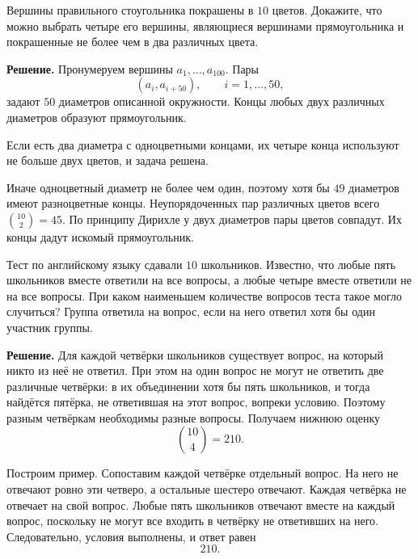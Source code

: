 \begin{problems}
\item Вершины правильного стоугольника покрашены в $10$ цветов. Докажите, что можно выбрать четыре его вершины, являющиеся вершинами прямоугольника и покрашенные не более чем в два различных цвета.
\par\smallskip\noindent\textbf{Решение.} Пронумеруем вершины $a_1,\ldots,a_{100}$. Пары
\[
(a_i,a_{i+50}),\qquad i=1,\ldots,50,
\]
задают $50$ диаметров описанной окружности. Концы любых двух различных диаметров образуют прямоугольник.
\par Если есть два диаметра с одноцветными концами, их четыре конца используют не больше двух цветов, и задача решена.
\par Иначе одноцветный диаметр не более чем один, поэтому хотя бы $49$ диаметров имеют разноцветные концы. Неупорядоченных пар различных цветов всего $\binom{10}{2}=45$. По принципу Дирихле у двух диаметров пары цветов совпадут. Их концы дадут искомый прямоугольник.\par

\item Тест по английскому языку сдавали $10$ школьников. Известно, что любые пять школьников вместе ответили на все вопросы, а любые четыре вместе ответили не на все вопросы. При каком наименьшем количестве вопросов теста такое могло случиться? Группа ответила на вопрос, если на него ответил хотя бы один участник группы.
\par\smallskip\noindent\textbf{Решение.} Для каждой четвёрки школьников существует вопрос, на который никто из неё не ответил. При этом на один вопрос не могут не ответить две различные четвёрки: в их объединении хотя бы пять школьников, и тогда найдётся пятёрка, не ответившая на этот вопрос, вопреки условию. Поэтому разным четвёркам необходимы разные вопросы. Получаем нижнюю оценку
\[
\binom{10}{4}=210.
\]
\par Построим пример. Сопоставим каждой четвёрке отдельный вопрос. На него не отвечают ровно эти четверо, а остальные шестеро отвечают. Каждая четвёрка не отвечает на свой вопрос. Любые пять школьников отвечают вместе на каждый вопрос, поскольку не могут все входить в четвёрку не ответивших на него. Следовательно, условия выполнены, и ответ равен
\[
210.
\]\par


\end{problems}
